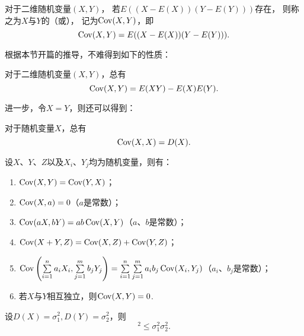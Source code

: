 \begin{definition}
对于二维随机变量\((X,Y)\)，
若\(E((X-E(X))(Y-E(Y)))\)存在，
则称之为\(X\)与\(Y\)的（或），
记为\(\operatorname{Cov}(X,Y)\)，即
\begin{equation}\label{equation:随机变量的数字特征.协方差的定义式}
\operatorname{Cov}(X,Y) = E((X-E(X))(Y-E(Y))).
\end{equation}
\end{definition}

根据本节开篇的推导，不难得到如下的性质：
\begin{property}\label{theorem:随机变量的数字特征.协方差的性质1}
对于二维随机变量\((X,Y)\)，总有
\begin{equation}\label{equation:随机变量的数字特征.协方差的计算式1}
\operatorname{Cov}(X,Y) = E(XY) - E(X) E(Y).
\end{equation}
\end{property}

进一步，令\(X = Y\)，则还可以得到：
\begin{property}\label{theorem:随机变量的数字特征.协方差的性质2}
对于随机变量\(X\)，总有
\begin{equation}\label{equation:随机变量的数字特征.协方差与方差的联系1}
\operatorname{Cov}(X,X) = D(X).
\end{equation}
\end{property}

\begin{property}\label{theorem:随机变量的数字特征.协方差的性质3}
设\(X\)、\(Y\)、\(Z\)以及\(X_i\)、\(Y_j\)均为随机变量，则有：
\begin{enumerate}
\item \(\operatorname{Cov}(X,Y)=\operatorname{Cov}(Y,X)\)；
\item \(\operatorname{Cov}(X,a)=0\)（\(a\)是常数）；
\item \(\operatorname{Cov}(aX,bY)=ab\operatorname{Cov}(X,Y)\)（\(a\)、\(b\)是常数）；
\item \(\operatorname{Cov}(X+Y,Z)=\operatorname{Cov}(X,Z)+\operatorname{Cov}(Y,Z)\)；
\item \(\operatorname{Cov}\left(\sum\limits_{i=1}^n{a_i X_i},\sum\limits_{j=1}^m{b_j Y_j}\right)
= \sum\limits_{i=1}^n \sum\limits_{j=1}^m {a_i b_j \operatorname{Cov}(X_i,Y_j)}\)（\(a_i\)、\(b_j\)是常数）；
\item 若\(X\)与\(Y\)相互独立，则\(\operatorname{Cov}(X,Y)=0\).
\end{enumerate}
\end{property}

\begin{theorem}
设\(D(X) = \sigma_1^2, D(Y) = \sigma_2^2\)，则\begin{equation}
[\Cov(X,Y)]^2 \leqslant \sigma_1^2 \sigma_2^2.
\end{equation}
\end{theorem}

